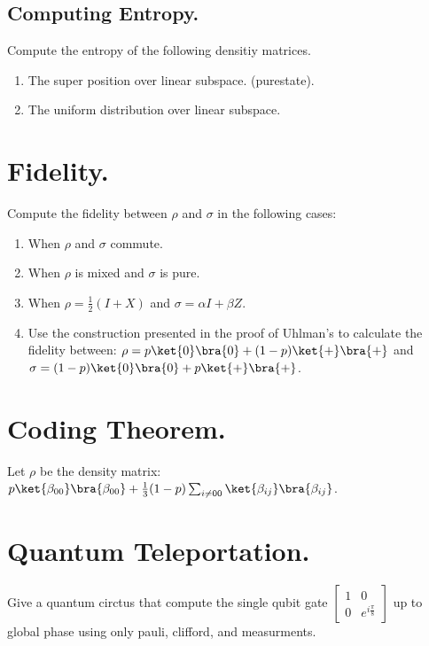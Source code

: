 \documentclass[12pt,a4paper]{article}
\begin{document}
\subsection{Computing Entropy.}

Compute the entropy of the following densitiy matrices. 
\begin{enumerate}
  \item The super position over linear subspace. (purestate). 
  \item The uniform distribution over linear subspace.
   
\end{enumerate}


\section{Fidelity.}
Compute the fidelity between $\rho$ and $\sigma$ in the following cases: 
\begin{enumerate}
  \item When $\rho$ and $\sigma$ commute. 
  \item When $\rho$ is mixed and $\sigma$ is pure.  
  \item When $\rho = \frac{1}{2}\left( I + X \right)$ and $\sigma = \alpha I + \beta Z$.
  \item Use the construction presented in the proof of Uhlman's to calculate the fidelity between: $\rho = p\ket{0}\bra{0} + (1-p)\ket{+}\bra{+}$  and $\sigma = (1-p)\ket{0}\bra{0} + p\ket{+}\bra{+}$. 
\end{enumerate}
\section{Coding Theorem.} 
Let $\rho$ be the density matrix: $p \ket{\beta_{00}}\bra{\beta_{00}} + \frac{1}{3}(1-p)\sum_{i \neq 00}{\ket{\beta_{ij}}\bra{\beta_{ij}}}$.
\section{Quantum Teleportation.}
Give a quantum circtus that compute the single qubit gate $\begin{bmatrix} 1 & 0 \\ 0 &  e^{i\frac{\pi}{8}} \end{bmatrix} $ up to global phase using only pauli, clifford, and measurments. 

\printbibliography 
\end{document}
